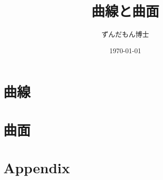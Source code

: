 \documentclass[dvipdfmx, 11pt, oneside, openany]{jsbook}
\title{曲線と曲面}
\author{ずんだもん博士}
\date{\today}
\theoremstyle{definition}
\begin{document}
  \maketitle
  \tableofcontents
  \part{曲線}
  
  
  
  
  
  
  \part{曲面}
  
  
  
  
  
  \part{Appendix}
  
\end{document}
